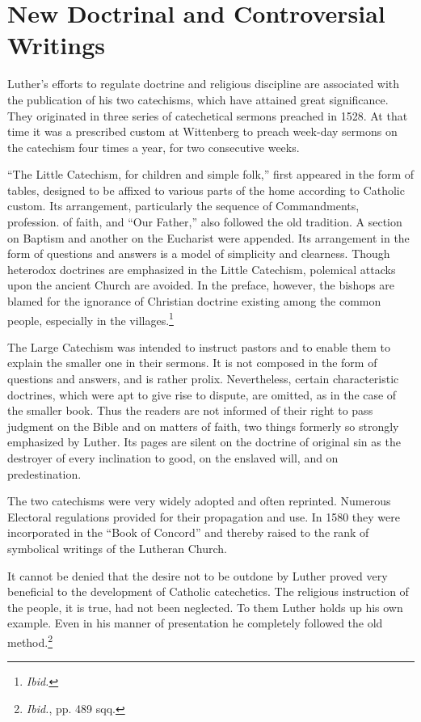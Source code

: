 \section{New Doctrinal and Controversial Writings}

Luther’s efforts to regulate doctrine and religious discipline are associated
with the publication of his two catechisms, which have attained great
significance. They originated in three series of catechetical
sermons preached in 1528. At that time it was a prescribed custom
at Wittenberg to preach week-day sermons on the catechism four
times a year, for two consecutive weeks.

“The Little Catechism, for children and simple folk,” first appeared
in the form of tables, designed to be affixed to various parts of the
home according to Catholic custom. Its arrangement, particularly
the sequence of Commandments, profession. of faith, and “Our
Father,” also followed the old tradition. A section on Baptism and
another on the Eucharist were appended. Its arrangement in the form
of questions and answers is a model of simplicity and clearness.
Though heterodox doctrines are emphasized in the Little Catechism,
polemical attacks upon the ancient Church are avoided. In the preface,
however, the bishops are blamed for the ignorance of Christian
doctrine existing among the common people, especially in the villages.\footnote{\textit{Ibid.}}

The Large Catechism was intended to instruct pastors and to enable
them to explain the smaller one in their sermons. It is not composed in
the form of questions and answers, and is rather prolix. Nevertheless,
certain characteristic doctrines, which were apt to give rise to dispute,
are omitted, as in the case of the smaller book. Thus the readers are not
informed of their right to pass judgment on the Bible and on matters
of faith, two things formerly so strongly emphasized by Luther. Its
pages are silent on the doctrine of original sin as the destroyer of every
inclination to good, on the enslaved will, and on predestination.

The two catechisms were very widely adopted and often reprinted.
Numerous Electoral regulations provided for their propagation and
use. In 1580 they were incorporated in the “Book of Concord” and
thereby raised to the rank of symbolical writings of the Lutheran
Church.

It cannot be denied that the desire not to be outdone by Luther
proved very beneficial to the development of Catholic catechetics.
The religious instruction of the people, it is true, had not been neglected.
To them Luther holds up his own example. Even in his manner of presentation
he completely followed the old method.\footnote{\textit{Ibid.}, pp. 489 sqq. }

